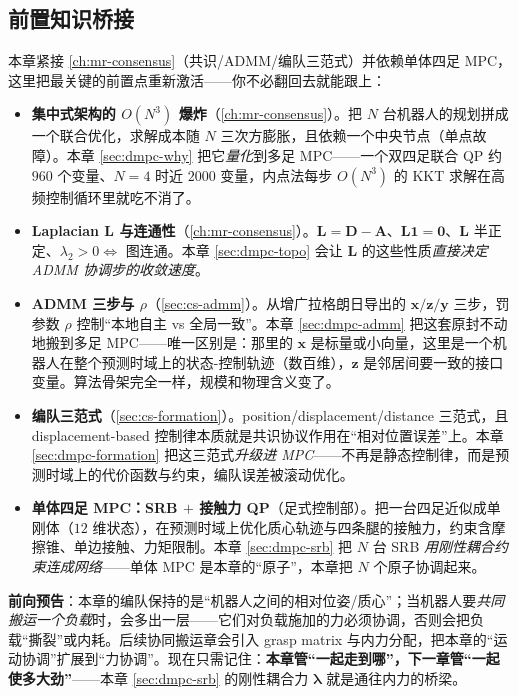 \subsection*{前置知识桥接}
本章紧接 \cref{ch:mr-consensus}（共识/ADMM/编队三范式）并依赖单体四足 MPC，这里把最关键的前置点重新激活——你不必翻回去就能跟上：
\begin{itemize}
  \item \textbf{集中式架构的 $O(N^3)$ 爆炸}（\cref{ch:mr-consensus}）。把 $N$ 台机器人的规划拼成一个联合优化，求解成本随 $N$ 三次方膨胀，且依赖一个中央节点（单点故障）。本章 \cref{sec:dmpc-why} 把它\emph{量化}到多足 MPC——一个双四足联合 QP 约 $960$ 个变量、$N=4$ 时近 $2000$ 变量，内点法每步 $O(N^3)$ 的 KKT 求解在高频控制循环里就吃不消了。
  \item \textbf{Laplacian $\mathbf{L}$ 与连通性}（\cref{ch:mr-consensus}）。$\mathbf{L}=\mathbf{D}-\mathbf{A}$、$\mathbf{L}\mathbf{1}=\mathbf{0}$、$\mathbf{L}$ 半正定、$\lambda_2>0\iff$ 图连通。本章 \cref{sec:dmpc-topo} 会让 $\mathbf{L}$ 的这些性质\emph{直接决定 ADMM 协调步的收敛速度}。
  \item \textbf{ADMM 三步与 $\rho$}（\cref{sec:cs-admm}）。从增广拉格朗日导出的 $\mathbf{x}/\mathbf{z}/\mathbf{y}$ 三步，罚参数 $\rho$ 控制“本地自主 vs 全局一致”。本章 \cref{sec:dmpc-admm} 把这套原封不动地搬到多足 MPC——唯一区别是：那里的 $\mathbf{x}$ 是标量或小向量，这里是一个机器人在整个预测时域上的状态-控制轨迹（数百维），$\mathbf{z}$ 是邻居间要一致的接口变量。算法骨架完全一样，规模和物理含义变了。
  \item \textbf{编队三范式}（\cref{sec:cs-formation}）。position/displacement/distance 三范式，且 displacement-based 控制律本质就是共识协议作用在“相对位置误差”上。本章 \cref{sec:dmpc-formation} 把这三范式\emph{升级进 MPC}——不再是静态控制律，而是预测时域上的代价函数与约束，编队误差被滚动优化。
  \item \textbf{单体四足 MPC：SRB $+$ 接触力 QP}（足式控制部）。把一台四足近似成单刚体（$12$ 维状态），在预测时域上优化质心轨迹与四条腿的接触力，约束含摩擦锥、单边接触、力矩限制。本章 \cref{sec:dmpc-srb} 把 $N$ 台 SRB \emph{用刚性耦合约束连成网络}——单体 MPC 是本章的“原子”，本章把 $N$ 个原子协调起来。
\end{itemize}

\noindent\textbf{前向预告}：本章的编队保持的是“机器人之间的相对位姿/质心”；当机器人要\emph{共同搬运一个负载}时，会多出一层——它们对负载施加的力必须协调，否则会把负载“撕裂”或内耗。后续协同搬运章会引入 grasp matrix 与内力分配，把本章的“运动协调”扩展到“力协调”。现在只需记住：\textbf{本章管“一起走到哪”，下一章管“一起使多大劲”}——本章 \cref{sec:dmpc-srb} 的刚性耦合力 $\boldsymbol{\lambda}$ 就是通往内力的桥梁。

